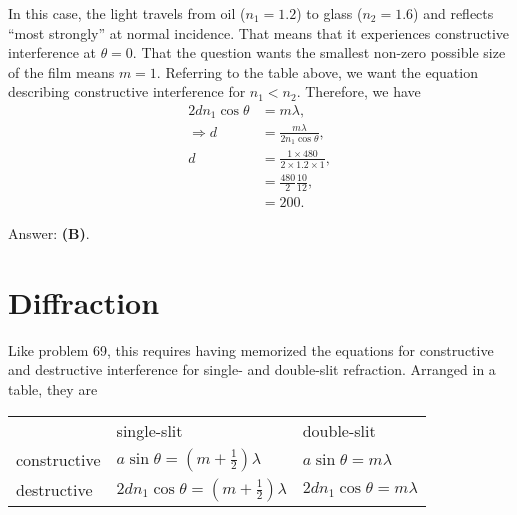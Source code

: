 \documentclass[11pt]{paper}
\newcommand{\answer}[1]{Answer: \textbf{(#1)}.}
\begin{document}
In this case, the light travels from oil ($n_1 = 1.2$) to glass ($n_2 = 1.6$) and reflects ``most strongly'' at normal incidence.  That means that it experiences constructive interference at $\theta = 0$.  That the question wants the smallest non-zero possible size of the film means $m=1$.  Referring to the table above, we want the equation describing constructive interference for $n_1<n_2$.  Therefore, we have
\begin{align}
2dn_1\cos{\theta} &= m\lambda,\\
\Rightarrow d &= \frac{m\lambda}{2n_1\cos{\theta}},\\
d &=\frac{1\times480}{2\times1.2\times1},\\
&=\frac{480}{2}\frac{10}{12},\\
&=200.
\end{align}

\answer{B}

\section{Diffraction}
Like problem 69, this requires having memorized the equations for constructive and destructive interference for single- and double-slit refraction.  Arranged in a table, they are
\begin{table}[h]
\centering
\bgroup
\def\arraystretch{1.5}
\begin{tabular}{lll}
                                  & single-slit  & double-slit    \\ \cline{2-3} 
\multicolumn{1}{l|}{constructive} & \multicolumn{1}{l|}{$a\sin{\theta} = (m+\frac{1}{2})\lambda$} & \multicolumn{1}{l|}{$a\sin{\theta} = m\lambda$} \\ \cline{2-3} 
\multicolumn{1}{l|}{destructive}  & \multicolumn{1}{l|}{$2dn_1\cos{\theta} = \left(m+\frac{1}{2}\right)\lambda$} & \multicolumn{1}{l|}{$2dn_1\cos{\theta} = m\lambda$} \\ \cline{2-3} 
\end{tabular}
\egroup
\end{table}
\end{document}
